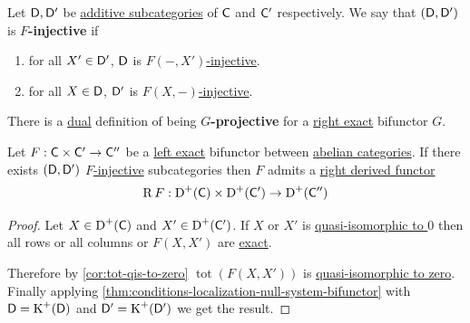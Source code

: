 \documentclass[../../main]{subfiles}
\begin{document}
\begin{definition}\label{def:F-injective-bifunctor}
  Let \(\mathsf{D}, \mathsf{D'}\) be \hyperref[def:subcategory]{additive subcategories} of \(\mathsf{C}\) and \(\mathsf{C'}\) respectively.
  We say that \((\mathsf{D}, \mathsf{D'})\) is \textbf{\(F\)-injective} if
  \begin{enumerate}
    \item for all \(X' \in \mathsf{D'}\), \(\mathsf{D}\) is \hyperref[def:F-injective-subcategory]{\(F(-, X')\)-injective}.
    \item for all \(X \in \mathsf{D}\), \(\mathsf{D'}\) is \hyperref[def:F-injective-subcategory]{\(F(X, -)\)-injective}.
  \end{enumerate}

  There is a \hyperref[def:dual]{dual} definition of being \textbf{\(G\)-projective} for a \hyperref[def:exact-functor]{right exact} bifunctor \(G\).
\end{definition}

\begin{theorem}\label{thm:existence-right-derived-bifunctor}
  Let \(F: \mathsf{C} \times \mathsf{C'} \to \mathsf{C''}\) be a \hyperref[def:exact-functor]{left exact} bifunctor between \hyperref[def:abelian-category]{abelian categories}.
  If there exists \((\mathsf{D}, \mathsf{D'})\) \hyperref[def:F-injective-bifunctor]{\(F\)-injective} subcategories then \(F\) admits a \hyperref[def:right-derived-bifunctor]{right derived functor}
  \begin{equation*}
    \operatorname{R}F: \operatorname{D}^{+}(\mathsf{C}) \times \operatorname{D}^{+}(\mathsf{C'}) \to \operatorname{D}^{+}(\mathsf{C''})
  \end{equation*}
\end{theorem}
\begin{proof}
  Let \(X \in \operatorname{D}^{+}(\mathsf{C})\) and \(X' \in \operatorname{D}^{+}(\mathsf{C'})\).
  If \(X\) or \(X'\) is \hyperref[def:quasi-isomorphism]{quasi-isomorphic to \(0\)} then all rows or all columns or \(F(X, X')\) are \hyperref[def:exact-sequence]{exact}.

  Therefore by \autoref{cor:tot-qis-to-zero} \(\operatorname{tot}(F(X, X'))\) is \hyperref[def:quasi-isomorphism]{quasi-isomorphic to zero}.
  Finally applying \autoref{thm:conditions-localization-null-system-bifunctor} with \(\mathsf{D} = \operatorname{K}^{+}(\mathsf{D})\) and \(\mathsf{D'} = \operatorname{K}^{+}(\mathsf{D'})\) we get the result.
\end{proof}
\end{document}
